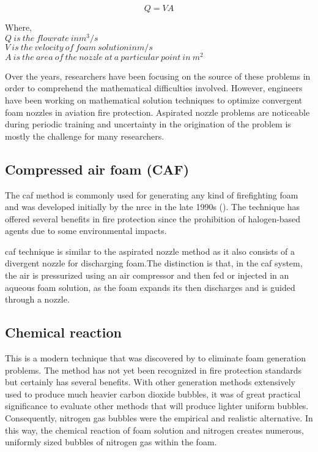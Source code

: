 \begin{equation}
    Q = VA
\end{equation}

\begin{doublespace}
    Where, \\
    $Q\ is\ the\ flowrate\ in m^3/s$ \\
    $V\ is\ the\ velocity\ of\ foam\ solution in m/s$ \\
    $A\ is\ the\ area\ of\ the\ nozzle\ at\ a\ particular\ point\ in\ m^2$ \\
\end{doublespace}

Over the years, researchers have been focusing on the source of these problems in order to comprehend the mathematical difficulties involved. However, engineers have been working on mathematical solution techniques to optimize convergent foam nozzles in aviation fire protection. Aspirated nozzle problems are noticeable during periodic training and uncertainty in the origination of the problem is mostly the challenge for many researchers.

\subsection{Compressed air foam (CAF)}
The \acrshort{caf} method is commonly used for generating any kind of firefighting foam and was developed initially by the \Acrfull{nrcc} in the late 1990s (\cite{rie2016class}). The technique has offered several benefits in fire protection since the prohibition of halogen-based agents due to some environmental impacts.   

\acrshort{caf} technique is similar to the aspirated nozzle method as it also consists of a divergent nozzle for discharging foam.The distinction is that, in the \acrshort{caf} system, the air is pressurized using an air compressor and then fed or injected in an aqueous foam solution, as the foam expands its then discharges and is guided through a nozzle.

\subsection{Chemical reaction}
This is a modern technique that was discovered by \cite{laundess2012suppression} to eliminate foam generation problems. The method has not yet been recognized in fire protection standards but certainly has several benefits. With other generation methods extensively used to produce much heavier carbon dioxide bubbles, it was of great practical significance to evaluate other methods that will produce lighter uniform bubbles. Consequently, nitrogen gas bubbles were the empirical and realistic alternative. In this way, the chemical reaction of foam solution and nitrogen creates numerous, uniformly sized bubbles of nitrogen gas within the foam.


